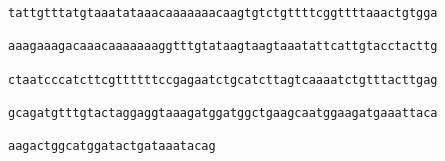 \documentclass{article}
\begin{document}
\begin{Verbatim}
tattgtttatgtaaatataaacaaaaaaacaagtgtctgttttcggttttaaactgtgga
                                                            
aaagaaagacaaacaaaaaaaggtttgtataagtaagtaaatattcattgtacctacttg
                                                            
ctaatcccatcttcgttttttccgagaatctgcatcttagtcaaaatctgtttacttgag
                                                            
gcagatgtttgtactaggaggtaaagatggatggctgaagcaatggaagatgaaattaca
                                                            
aagactggcatggatactgataaatacag
                             
                             
\end{Verbatim}
\end{document}
